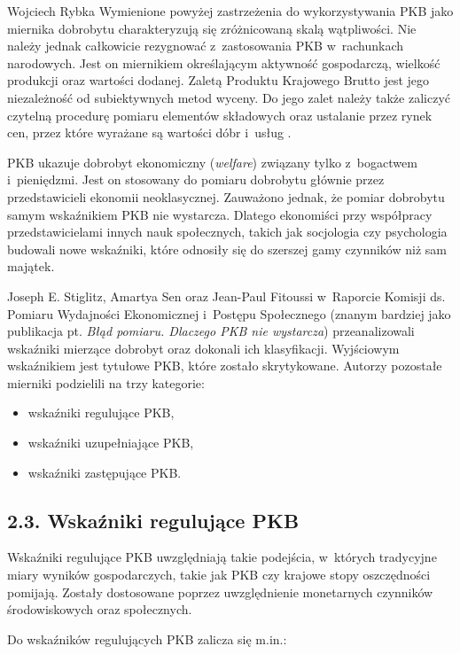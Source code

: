 \begin{artplenv}{Wojciech Rybka}
Wymienione powyżej zastrzeżenia do wykorzystywania PKB jako miernika dobrobytu charakteryzują się zróżnicowaną skalą
wątpliwości. Nie należy jednak całkowicie rezygnować z~zastosowania PKB w~rachunkach narodowych. Jest on miernikiem
określającym aktywność gospodarczą, wielkość produkcji oraz wartości dodanej. Zaletą Produktu Krajowego Brutto jest
jego niezależność od subiektywnych metod wyceny. Do jego zalet należy także zaliczyć czytelną procedurę pomiaru
elementów składowych oraz ustalanie przez rynek cen, przez które wyrażane są wartości dóbr i~usług
\parencite{luszczyk_pomiar_2013}.

PKB ukazuje dobrobyt ekonomiczny (\textit{welfare}) związany tylko z~bogactwem i~pieniędzmi. Jest on stosowany do
pomiaru dobrobytu głównie przez przedstawicieli ekonomii neoklasycznej. Zauważono jednak, że pomiar dobrobytu samym
wskaźnikiem PKB nie wystarcza. Dlatego ekonomiści przy współpracy przedstawicielami innych nauk społecznych, takich jak
socjologia czy psychologia budowali nowe wskaźniki, które odnosiły się do szerszej gamy czynników niż sam majątek. 

Joseph E. Stiglitz, Amartya Sen oraz Jean-Paul Fitoussi w~Raporcie Komisji ds. Pomiaru Wydajności Ekonomicznej i~Postępu
Społecznego
\parencite{stiglitz_blad_2013}
(znanym bardziej jako publikacja pt. \textit{Błąd pomiaru.
Dlaczego PKB nie wystarcza}) przeanalizowali wskaźniki mierzące dobrobyt oraz dokonali ich klasyfikacji. Wyjściowym
wskaźnikiem jest tytułowe PKB, które zostało skrytykowane. Autorzy pozostałe mierniki podzielili na trzy kategorie:

\begin{itemize}
\item wskaźniki regulujące PKB,
\item wskaźniki uzupełniające PKB,
\item wskaźniki zastępujące PKB. 
\end{itemize}
\subsection{2.3. Wskaźniki regulujące PKB}
Wskaźniki regulujące PKB uwzględniają takie podejścia, w~których tradycyjne miary wyników gospodarczych, takie jak PKB
czy krajowe stopy oszczędności pomijają. Zostały dostosowane poprzez uwzględnienie monetarnych czynników środowiskowych
oraz społecznych.

Do wskaźników regulujących PKB zalicza się m.in.:


\end{artplenv}
